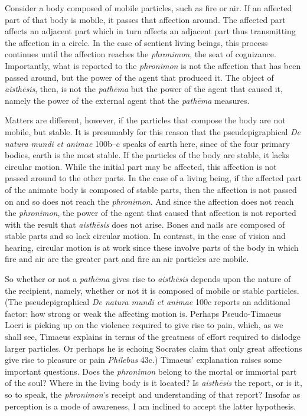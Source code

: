 Consider a body composed of mobile particles, such as fire or air. If an affected part of that body is mobile, it passes that affection around. The affected part affects an adjacent part which in turn affects an adjacent part thus transmitting the affection in a circle. In the case of sentient living beings, this process continues until the affection reaches the \emph{phronimon}, the seat of cognizance. Importantly, what is reported to the \emph{phronimon} is not the affection that has been passed around, but the power of the agent that produced it. The object of \emph{aisthēsis}, then, is not the \emph{pathēma} but the power of the agent that caused it, namely the power of the external agent that the \emph{pathēma} measures.

Matters are different, however, if the particles that compose the body are not mobile, but stable. It is presumably for this reason that the pseudepigraphical \emph{De natura mundi et animae} 100b--c speaks of earth here, since of the four primary bodies, earth is the most stable. If the particles of the body are stable, it lacks circular motion. While the initial part may be affected, this affection is not passed around to the other parts. In the case of a living being, if the affected part of the animate body is composed of stable parts, then the affection is not passed on and so does not reach the \emph{phronimon}. And since the affection does not reach the \emph{phronimon}, the power of the agent that caused that affection is not reported with the result that \emph{aisthēsis} does not arise. Bones and nails are composed of stable parts and so lack circular motion. In contrast, in the case of vision and hearing, circular motion is at work since these involve parts of the body in which fire and air are the greater part and fire an air particles are mobile.

So whether or not a \emph{pathēma} gives rise to \emph{aisthēsis} depends upon the nature of the recipient, namely, whether or not it is composed of mobile or stable particles. (The pseudepigraphical \emph{De natura mundi et animae} 100c reports an additional factor: how strong or weak the affecting motion is. Perhaps Pseudo-Timaeus Locri is picking up on the violence required to give rise to pain, which, as we shall see, Timaeus explains in terms of the greatness of effort required to dislodge larger particles. Or perhaps he is echoing Socrates claim that only great affections give rise to pleasure or pain \emph{Philebus} 43c.) Timaeus' explanation raises some important questions. Does the \emph{phronimon} belong to the mortal or immortal part of the soul? Where in the living body is it located? Is \emph{aisthēsis} the report, or is it, so to speak, the \emph{phronimon}'s receipt and understanding of that report? Insofar as perception is a mode of awareness, I am inclined to accept the latter hypothesis.

